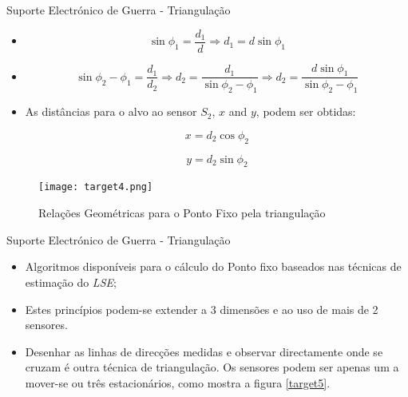 \documentclass[portuguese,10pt]{beamer}
\begin{document}
\begin{frame}{Suporte Electrónico de Guerra - Triangulação}
   
    \begin{itemize}
        \item \begin{equation*}
    \sin{\phi_1} = \frac{d_1}{d} \Rightarrow 
    d_1 = d \sin{\phi_1}
    \end{equation*}


       
        \item \begin{equation*}
\sin{\phi_2 - \phi_1} = \frac{d_1}{d_2} \Rightarrow d_2 = \frac{d_1}{\sin{\phi_2 - \phi_1}} \Rightarrow d_2 = \frac{d \sin{\phi_1}}{\sin{\phi_2 - \phi_1}}     
\end{equation*}
        
        \item As distâncias para o alvo ao sensor $S_2$, $x$ and $y$, podem ser obtidas:

\begin{equation*}
x = d_2 \cos{\phi_2}     
\end{equation*}

\begin{equation*}
y = d_2 \sin{\phi_2}     
\end{equation*}
        
    \end{itemize}
    \begin{figure}[ht]
\centering
\texttt{[image: target4.png]}
\caption{Relações Geométricas para o Ponto Fixo pela triangulação}
\label{target4}
\end{figure}
\end{frame}

  \begin{frame}{Suporte Electrónico de Guerra - Triangulação}
   
    \begin{itemize}
        \item Algoritmos disponíveis para o cálculo do Ponto fixo baseados nas técnicas de estimação do \textit{LSE};
      \vspace*{5mm}
        \item Estes princípios podem-se extender a 3 dimensões e ao uso de mais de 2 sensores. 
        \vspace*{5mm}
        \item Desenhar as linhas de direcções medidas e observar directamente onde se cruzam é outra técnica de triangulação. Os sensores podem ser apenas um a mover-se ou três estacionários, como mostra a figura \ref{target5}.
    \end{itemize}
\end{frame}
    
\end{document}
